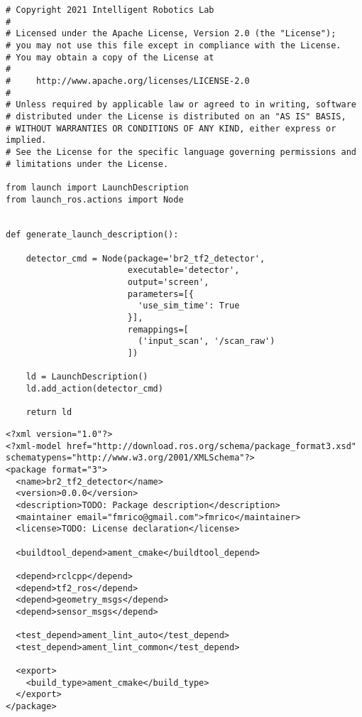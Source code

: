  \footnotesize
\begin{tcolorbox}[sharp corners, colframe=gray!80, colback=LightGray, left=0pt, top=0pt, bottom=0pt, title=\texttt{br2\_tf2\_detector/launch/detector\_basic.launch.py}]
  \begin{verbatim}
# Copyright 2021 Intelligent Robotics Lab
#
# Licensed under the Apache License, Version 2.0 (the "License");
# you may not use this file except in compliance with the License.
# You may obtain a copy of the License at
#
#     http://www.apache.org/licenses/LICENSE-2.0
#
# Unless required by applicable law or agreed to in writing, software
# distributed under the License is distributed on an "AS IS" BASIS,
# WITHOUT WARRANTIES OR CONDITIONS OF ANY KIND, either express or implied.
# See the License for the specific language governing permissions and
# limitations under the License.

from launch import LaunchDescription
from launch_ros.actions import Node


def generate_launch_description():

    detector_cmd = Node(package='br2_tf2_detector',
                        executable='detector',
                        output='screen',
                        parameters=[{
                          'use_sim_time': True
                        }],
                        remappings=[
                          ('input_scan', '/scan_raw')
                        ])

    ld = LaunchDescription()
    ld.add_action(detector_cmd)

    return ld
    \end{verbatim}
    \end{tcolorbox}
  \normalsize

 \footnotesize
\begin{tcolorbox}[sharp corners, colframe=gray!80, colback=LightGray, left=0pt, top=0pt, bottom=0pt, title=\texttt{br2\_tf2\_detector/package.xml}]
  \begin{verbatim}
<?xml version="1.0"?>
<?xml-model href="http://download.ros.org/schema/package_format3.xsd" schematypens="http://www.w3.org/2001/XMLSchema"?>
<package format="3">
  <name>br2_tf2_detector</name>
  <version>0.0.0</version>
  <description>TODO: Package description</description>
  <maintainer email="fmrico@gmail.com">fmrico</maintainer>
  <license>TODO: License declaration</license>

  <buildtool_depend>ament_cmake</buildtool_depend>

  <depend>rclcpp</depend>
  <depend>tf2_ros</depend>
  <depend>geometry_msgs</depend>
  <depend>sensor_msgs</depend>

  <test_depend>ament_lint_auto</test_depend>
  <test_depend>ament_lint_common</test_depend>

  <export>
    <build_type>ament_cmake</build_type>
  </export>
</package>
    \end{verbatim}
    \end{tcolorbox}
  \normalsize

